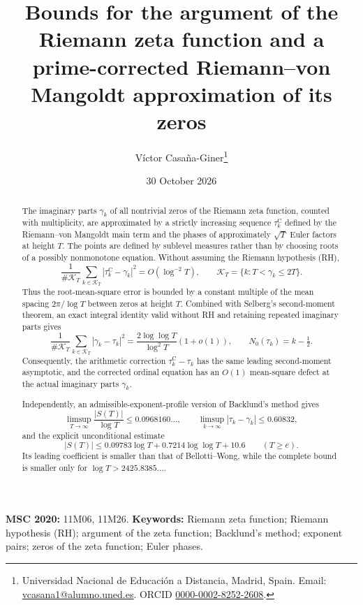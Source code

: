 \documentclass[11pt,a4paper]{article}
\title{Bounds for the argument of the Riemann zeta function and a prime-corrected Riemann--von Mangoldt approximation of its zeros}
\author{V\'ictor Casa\~na-Giner\thanks{Universidad Nacional de Educaci\'on a Distancia, Madrid, Spain. Email: \href{mailto:vcasana1@alumno.uned.es}{vcasana1@alumno.uned.es}. ORCID \href{https://orcid.org/0000-0002-8252-2608}{0000-0002-8252-2608}.}}
\date{30 October 2026}
\numberwithin{equation}{section}
\theoremstyle{definition}
\theoremstyle{remark}
\begin{document}
\maketitle

\begin{abstract}
The imaginary parts $\gamma_k$ of all nontrivial zeros of the Riemann zeta function, counted with multiplicity, are approximated by a strictly increasing sequence $\tau_k^{\mathrm C}$ defined by the Riemann--von Mangoldt main term and the phases of approximately $\sqrt T$ Euler factors at height $T$. The points are defined by sublevel measures rather than by choosing roots of a possibly nonmonotone equation. Without assuming the Riemann hypothesis (RH),
\[
\frac{1}{\#\mathcal K_T}\sum_{k\in\mathcal K_T}
|\tau_k^{\mathrm C}-\gamma_k|^2=O(\log^{-2}T),
\qquad \mathcal K_T=\{k:T<\gamma_k\le2T\}.
\]
Thus the root-mean-square error is bounded by a constant multiple of the mean spacing $2\pi/\log T$ between zeros at height $T$. Combined with Selberg's second-moment theorem, an exact integral identity valid without RH and retaining repeated imaginary parts gives
\[
\frac1{\#\mathcal K_T}\sum_{k\in\mathcal K_T}
|\gamma_k-\tau_k|^2
=\frac{2\log\log T}{\log^2T}(1+o(1)),
\qquad N_0(\tau_k)=k-\tfrac12.
\]
Consequently, the arithmetic correction $\tau_k^{\mathrm C}-\tau_k$ has the same leading second-moment asymptotic, and the corrected ordinal equation has an $O(1)$ mean-square defect at the actual imaginary parts $\gamma_k$.

Independently, an admissible-exponent-profile version of Backlund's method gives
\[
\limsup_{T\to\infty}\frac{|S(T)|}{\log T}\le0.0968160\ldots,
\qquad
\limsup_{k\to\infty}|\tau_k-\gamma_k|\le0.60832,
\]
and the explicit unconditional estimate
\[
|S(T)|\le0.09783\log T+0.7214\log\log T+10.6
\qquad (T\ge e).
\]
Its leading coefficient is smaller than that of Bellotti--Wong, while the complete bound is smaller only for $\log T>2425.8385\ldots$.
\end{abstract}

\medskip
\noindent\textbf{MSC 2020:} 11M06, 11M26. \quad \textbf{Keywords:} Riemann zeta function; Riemann hypothesis (RH); argument of the zeta function; Backlund's method; exponent pairs; zeros of the zeta function; Euler phases.

\tableofcontents

\end{document}
